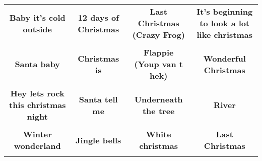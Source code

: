 \documentclass[12pt]{article} \usepackage{eso-pic, graphicx}
\newcommand{\background}[1]{%
\AddToShipoutPictureBG*{\texttt{[image: \#1]}}
}
\begin{document}
\tabcolsep=30.2pt \renewcommand{\arraystretch}{4.5}   \vspace*{4.3cm} \begin{center}  \begin{tabular}{c c c c}
\parbox{3cm}{\centering \textbf{Baby it’s cold outside}}& 
\parbox{3cm}{\centering \textbf{12 days of Christmas}}& 
\parbox{3cm}{\centering \textbf{Last Christmas (Crazy Frog)}}& 
\parbox{3cm}{\centering \textbf{It’s beginning to look a lot like christmas}}\\ \\ 
\parbox{3cm}{\centering \textbf{Santa baby}}& 
\parbox{3cm}{\centering \textbf{Christmas is}}& 
\parbox{3cm}{\centering \textbf{Flappie (Youp van t hek)}}& 
\parbox{3cm}{\centering \textbf{Wonderful Christmas}}\\ \\ 
\parbox{3cm}{\centering \textbf{Hey lets rock this christmas night}}& 
\parbox{3cm}{\centering \textbf{Santa tell me}}& 
\parbox{3cm}{\centering \textbf{Underneath the tree}}& 
\parbox{3cm}{\centering \textbf{River}}\\ \\ 
\parbox{3cm}{\centering \textbf{Winter wonderland}}& 
\parbox{3cm}{\centering \textbf{Jingle bells}}& 
\parbox{3cm}{\centering \textbf{White christmas}}& 
\parbox{3cm}{\centering \textbf{Last Christmas}}\\ \\ 
\end{tabular} \background{discobingo.pdf} \end{center} 
\end{document}
